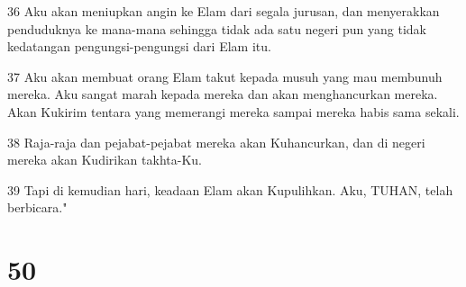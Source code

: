 \par 36 Aku akan meniupkan angin ke Elam dari segala jurusan, dan menyerakkan penduduknya ke mana-mana sehingga tidak ada satu negeri pun yang tidak kedatangan pengungsi-pengungsi dari Elam itu.
\par 37 Aku akan membuat orang Elam takut kepada musuh yang mau membunuh mereka. Aku sangat marah kepada mereka dan akan menghancurkan mereka. Akan Kukirim tentara yang memerangi mereka sampai mereka habis sama sekali.
\par 38 Raja-raja dan pejabat-pejabat mereka akan Kuhancurkan, dan di negeri mereka akan Kudirikan takhta-Ku.
\par 39 Tapi di kemudian hari, keadaan Elam akan Kupulihkan. Aku, TUHAN, telah berbicara."

\chapter{50}

